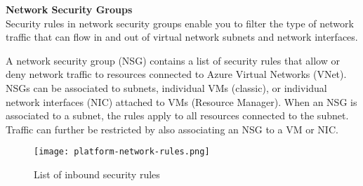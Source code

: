 \textbf{Network Security Groups} \\
Security rules in network security groups enable you to filter the type of network traffic that can flow in and out of virtual network subnets and network interfaces.

A network security group (NSG) contains a list of security rules that allow or deny network traffic to resources connected to Azure Virtual Networks (VNet). NSGs can be associated to subnets, individual VMs (classic), or individual network interfaces (NIC) attached to VMs (Resource Manager).  When an NSG is associated to a subnet, the rules apply to all resources connected to the subnet. Traffic can further be restricted by also associating an NSG to a VM or NIC.

\begin{figure}[!h]
\texttt{[image: platform-network-rules.png]}
\caption{List of inbound security rules}
\end{figure}
